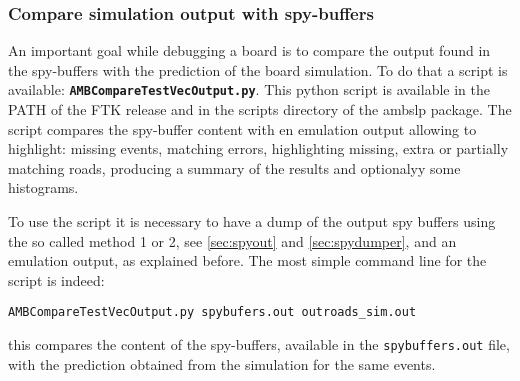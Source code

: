 \subsubsection{Compare simulation output with spy-buffers}
\label{sec:ambcompare}

An important goal while debugging a board is to compare the output found
in the spy-buffers with the prediction of the board simulation. To
do that a script is available:
 \texttt{\textbf{AMBCompareTestVecOutput.py}}. 
This python script is available in the PATH of the FTK release and in the
scripts directory of the ambslp package. The script compares the spy-buffer content
with en emulation output allowing to highlight: missing events, matching errors,
highlighting missing, extra or partially matching roads, producing a summary
of the results and optionalyy some histograms.

To use the script it is necessary to have a dump of the output spy buffers
using the so called method 1 or 2, see \ref{sec:spyout} and \ref{sec:spydumper},
and an emulation output, as explained before. The most simple command line
for the script is indeed:
\begin{verbatim}
AMBCompareTestVecOutput.py spybufers.out outroads_sim.out
\end{verbatim}
this compares the content of the spy-buffers, available in the 
\verb|spybuffers.out| file, with the prediction obtained from the simulation for the same events.

